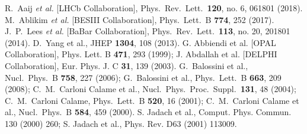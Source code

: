 \documentclass[a4paper,11pt]{article}
\begin{document}
\begin{thebibliography}{00}
  R.~Aaij {\it et al.} [LHCb Collaboration],
  Phys.\ Rev.\ Lett.\  {\bf 120}, no. 6, 061801 (2018).
  M.~Ablikim {\it et al.} [BESIII Collaboration],
  Phys.\ Lett.\ B {\bf 774}, 252 (2017).
  J.~P.~Lees {\it et al.} [BaBar Collaboration],
  Phys.\ Rev.\ Lett.\  {\bf 113}, no. 20, 201801 (2014).
  D.~Yang et al.,
  JHEP {\bf 1304}, 108 (2013).
 G. Abbiendi et al. [OPAL Collaboration], Phys. Lett. B {\bf 471}, 293 (1999);  J. Abdallah et al.
[DELPHI Collaboration], Eur. Phys. J. C {\bf 31}, 139 (2003).
G.~Balossini et al.,
  Nucl.\ Phys.\ B {\bf 758}, 227 (2006); G.~Balossini et al.,
  Phys.\ Lett.\ B {\bf 663}, 209 (2008); C.~M.~Carloni Calame et al.,
  Nucl.\ Phys.\ Proc.\ Suppl.\  {\bf 131}, 48 (2004); C.~M.~Carloni Calame,
  Phys.\ Lett.\ B {\bf 520}, 16 (2001); C.~M.~Carloni Calame et al.,
  Nucl.\ Phys.\ B {\bf 584}, 459 (2000).
S. Jadach et al., Comput. Phys. Commun. 130 (2000) 260; S. Jadach et al., Phys. Rev. D63 (2001) 113009.
\end{thebibliography}
\end{document}
